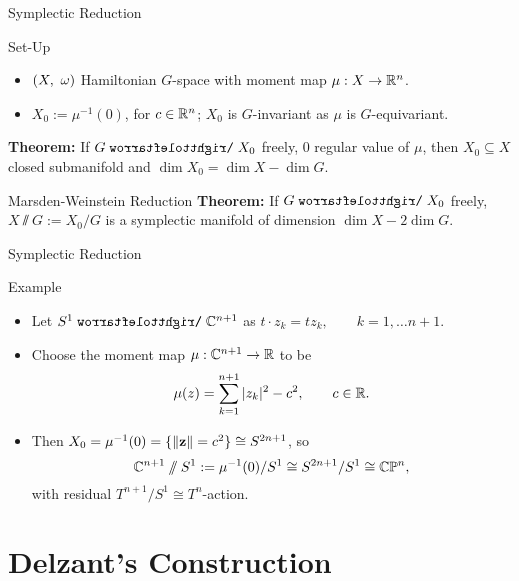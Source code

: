 \begin{frame}{Symplectic Reduction}
    \begin{block}{Set-Up}
        \begin{itemize}
        \item $(X,\ \omega)$ Hamiltonian $G$-space with moment map $\mu : X \rightarrow \mathbb{R}^{n}$.
        \item $X_{0} := \mu^{-1}(0)$, for $c \in \mathbb{R}^{n}$; $X_{0}$ is $G$-invariant as $\mu$ is $G$-equivariant.
        \end{itemize}
        \textbf{Theorem:} If $G \acts X_{0}$ freely, $0$ regular value of $\mu$, then $X_{0} \subseteq X$ closed submanifold and $\dim X_{0} = \dim X - \dim G$.
    \end{block}

    \begin{block}{Marsden-Weinstein Reduction}
        \textbf{Theorem:} If $G \acts X_{0}$ freely, $X \sslash G := X_{0} / G$ is a symplectic manifold of dimension $\dim X - 2 \dim G$. 
    \end{block}
\end{frame}

\begin{frame}{Symplectic Reduction}
    \begin{block}{Example}
        \begin{itemize}
            \item Let $S^{1} \acts \CC^{n+1}$ as $t \cdot z_{k} = tz_{k}, \qquad k = 1, \ldots n+1$.
            \item Choose the moment map $\mu : \mathbb{C}^{n+1} \rightarrow \mathbb{R}$ to be
            $$ \mu(z) = \sum_{k=1}^{n+1} |z_{k}|^{2} - c^{2}, \qquad c \in \mathbb{R}. $$
            \item Then $ X_{0} = \mu^{-1}(0) = \{ \| \vb{z} \| = c^{2} \} \cong S^{2n+1} $, so
            $$ \mathbb{C}^{n+1} \sslash S^{1} := \mu^{-1}(0)/S^{1} \cong S^{2n+1}/S^{1} \cong \mathbb{C}\mathbb{P}^{n}, $$
            with residual $T^{n+1}/S^{1} \cong T^{n}$-action. 
        \end{itemize}
    \end{block}
\end{frame}

\section{Delzant's Construction}

